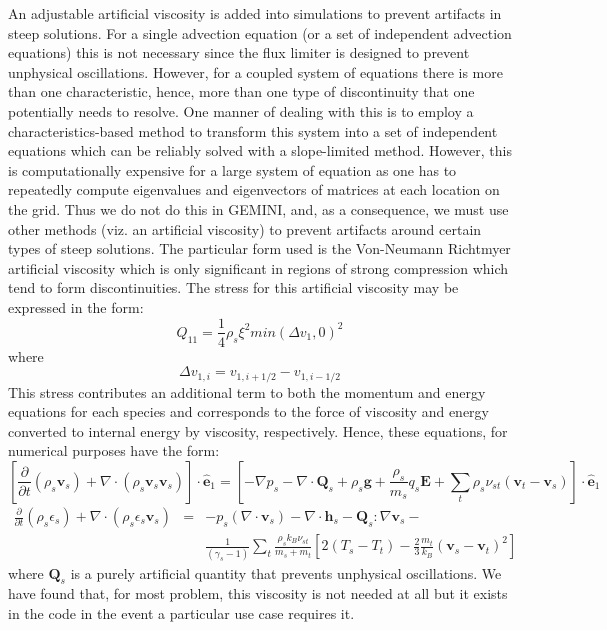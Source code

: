 \documentclass[11pt,letterpaper]{article}
\begin{document}
An adjustable artificial viscosity is added into simulations to prevent artifacts in steep solutions.  For a single advection equation (or a set of independent advection equations) this is not necessary since the flux limiter is designed to prevent unphysical oscillations.  However, for a coupled system of equations there is more than one characteristic, hence, more than one type of discontinuity that one potentially needs to resolve.  One manner of dealing with this is to employ a characteristics-based method \citep[e.g.][]{Leveque:2002} to transform this system into a set of independent equations which can be reliably solved with a slope-limited method.  However, this is computationally expensive for a large system of equation as one has to repeatedly compute eigenvalues and eigenvectors of matrices at each location on the grid.  Thus we do not do this in GEMINI, and, as a consequence, we must use other methods (viz. an artificial viscosity) to prevent artifacts around certain types of steep solutions.  The particular form used is the Von-Neumann Richtmyer artificial viscosity \citep{Richtmyer:1994} which is only significant in regions of strong compression which tend to form discontinuities.  The stress for this artificial viscosity may be expressed in the form:
\begin{equation}
Q_{11} = \frac{1}{4} \rho_s \xi^2 min(\Delta v_1,0)^2 
\end{equation}
where
\begin{equation}
\Delta v_{1,i} = v_{1,i+1/2} - v_{1,i-1/2}
\end{equation}
This stress contributes an additional term to both the momentum and energy equations for each species and corresponds to the force of viscosity and energy converted to internal energy by viscosity, respectively.  Hence, these equations, for numerical purposes have the form:
\begin{equation}
\left[ \frac{\partial }{\partial t} \left( \rho_s \mathbf{v}_s \right) + \nabla \cdot \left( \rho_s \mathbf{v}_s \mathbf{v}_s \right) \right] \cdot \hat{\mathbf{e}}_1 = \left[ -\nabla p_s - \nabla \cdot \mathbf{Q}_s + \rho_s \mathbf{g} + \frac{\rho_s} {m_s} q_s \mathbf{E} + \sum_t \rho_s \nu_{st} \left(\mathbf{v}_t - \mathbf{v}_s \right) \right] \cdot \hat{\mathbf{e}}_1 \label{eqn:stressmom}
\end{equation}
\begin{eqnarray}
\frac{\partial}{\partial t} \left( \rho_s \epsilon_s \right) + \nabla \cdot \left( \rho_s \epsilon_s \mathbf{v}_s \right) &=& - p_s (\nabla \cdot \mathbf{v}_s) - \nabla \cdot \mathbf{h}_s - \mathbf{Q}_s : \nabla \mathbf{v}_s - \\
\nonumber&& \frac{1}{(\gamma_s - 1 )}\sum_t \frac{\rho_s k_B \nu_{st}}{m_s + m_t}\left[ 2 (T_s-T_t) - \frac{2}{3} \frac{m_t}{k_B}(\mathbf{v}_s-\mathbf{v}_t)^2 \right]  \label{eqn:stressen}
\end{eqnarray}
where $\mathbf{Q}_s$ is a purely artificial quantity that prevents unphysical oscillations.  We have found that, for most problem, this viscosity is not needed at all but it exists in the code in the event a particular use case requires it.  
\end{document}
